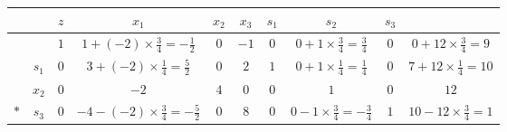 \documentclass[a4paper,12pt]{article}
\begin{document}
\begin{table}[H]
    \tiny
    \begin{tabularx}{\textwidth}{cc|ccccccc|c}
            &       & $z$ & $x_1$                                         & $x_2$ & $x_3$ & $s_1$ & $s_2$                                     & $s_3$ &                                  \\
        \hline
            &       & $1$ & $1 + (-2) \times \frac{3}{4} = -\frac{1}{2}$  & $0$   & $-1$  & $0$   & $0 + 1 \times \frac{3}{4} = \frac{3}{4}$  & $0$   & $0 + 12 \times \frac{3}{4} = 9$  \\
        \hline
            & $s_1$ & $0$ & $3 + (-2) \times \frac{1}{4} = \frac{5}{2}$   & $0$   & $2$   & $1$   & $0 + 1 \times \frac{1}{4} = \frac{1}{4}$  & $0$   & $7 + 12 \times \frac{1}{4} = 10$ \\
            & $x_2$ & $0$ & $-2$                                          & $4$   & $0$   & $0$   & $1$                                       & $0$   & $12$                             \\
        $*$ & $s_3$ & $0$ & $-4 - (-2) \times \frac{3}{4} = -\frac{5}{2}$ & $0$   & $8$   & $0$   & $0 - 1 \times \frac{3}{4} = -\frac{3}{4}$ & $1$   & $10 - 12 \times \frac{3}{4} = 1$ \\
    \end{tabularx}
\end{table}
\end{document}
